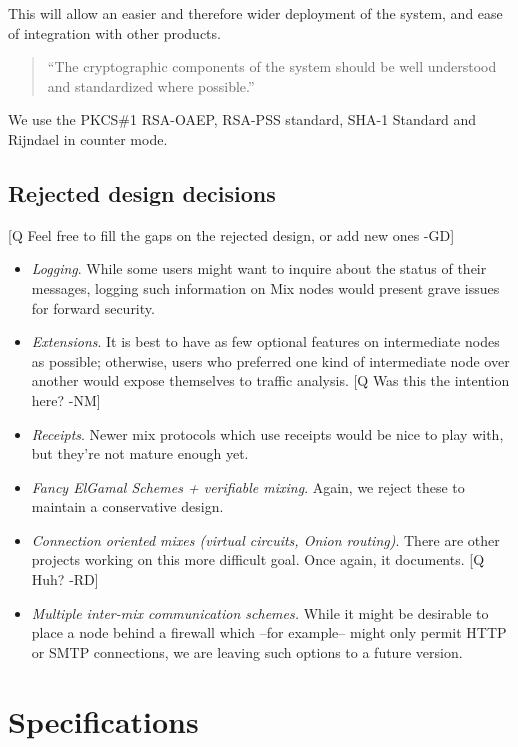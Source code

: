 \documentclass{article}
\begin{document}
This will allow an easier and therefore wider deployment of the
system, and ease of integration with other products.

\begin{quote}
     ``The cryptographic components of the system should be well
     understood and standardized where possible.''
\end{quote}

We use the PKCS\#1 RSA-OAEP, RSA-PSS standard, SHA-1 Standard and
Rijndael in counter mode. 

\subsection{Rejected design decisions}

[Q Feel free to fill the gaps on the rejected design, or add new
ones -GD]

\begin{itemize}
\item \emph{Logging}.  While some users might want to inquire about
   the status of their messages, logging such information on Mix nodes
   would present grave issues for forward security.
\item \emph{Extensions}.  It is best to have as few optional features
   on intermediate nodes as possible; otherwise, users who preferred
   one kind of intermediate node over another would expose themselves
   to traffic analysis. [Q Was this the intention here? -NM]
\item \emph{Receipts}. Newer mix protocols which use receipts would
   be nice to play with, but they're not mature enough yet.
\item \emph{Fancy ElGamal Schemes + verifiable mixing}.  Again, we
   reject these to maintain a conservative design.
\item \emph{Connection oriented mixes (virtual circuits, Onion routing)}.
   There are other projects working on this more difficult goal. 
   Once again, it documents.
   [Q Huh? -RD]
\item \emph{Multiple inter-mix communication schemes.}  While it might
   be desirable to place a node behind a firewall which --for
   example-- might only permit HTTP or SMTP connections, we are
   leaving such options to a future version.
\end{itemize}

\section{Specifications}
\end{document}
